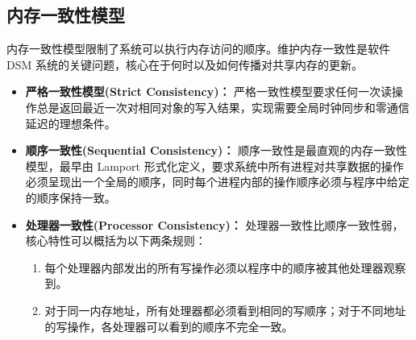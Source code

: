 {    %



    \subsection{内存一致性模型}
    内存一致性模型限制了系统可以执行内存访问的顺序。维护内存一致性是软件 DSM 系统的关键问题，核心在于何时以及如何传播对共享内存的更新。

    \begin{itemize}
        \item \textbf{严格一致性模型(Strict Consistency)：} 严格一致性模型要求任何一次读操作总是返回最近一次对相同对象的写入结果，实现需要全局时钟同步和零通信延迟的理想条件。

        \item \textbf{顺序一致性(Sequential Consistency)：} 顺序一致性是最直观的内存一致性模型，最早由 Lamport 形式化定义，要求系统中所有进程对共享数据的操作必须呈现出一个全局的顺序，同时每个进程内部的操作顺序必须与程序中给定的顺序保持一致。

        \item \textbf{处理器一致性(Processor Consistency)：} 处理器一致性比顺序一致性弱，核心特性可以概括为以下两条规则：
              \begin{enumerate}[label=\arabic*.]
                  \item 每个处理器内部发出的所有写操作必须以程序中的顺序被其他处理器观察到。
                  \item 对于同一内存地址，所有处理器都必须看到相同的写顺序；对于不同地址的写操作，各处理器可以看到的顺序不完全一致。
              \end{enumerate}


\end{itemize}}
